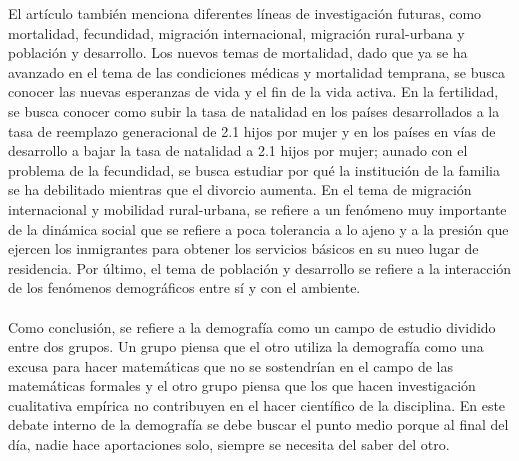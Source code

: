 \documentclass[11pt,spanish,letterpaper]{article}
\theoremstyle{plain}
\begin{document}
El art\'iculo tambi\'en menciona diferentes l\'ineas de investigaci\'on futuras, como mortalidad, fecundidad, migraci\'on internacional, migraci\'on rural-urbana y poblaci\'on y desarrollo. Los nuevos temas de mortalidad, dado que ya se ha avanzado en el tema de las condiciones m\'edicas y mortalidad temprana, se busca conocer las nuevas esperanzas de vida y el fin de la vida activa. En la fertilidad, se busca conocer como subir la tasa de natalidad en los pa\'ises desarrollados a la tasa de reemplazo generacional de 2.1 hijos por mujer y en los pa\'ises en v\'ias de desarrollo a bajar la tasa de natalidad a 2.1 hijos por mujer; aunado con el problema de la fecundidad, se busca estudiar por qu\'e la instituci\'on de la familia se ha debilitado mientras que el divorcio aumenta. En el tema de migraci\'on internacional y mobilidad rural-urbana, se refiere a un fen\'omeno muy importante de la din\'amica social que se refiere a poca tolerancia a lo ajeno y a la presi\'on que ejercen los inmigrantes para obtener los servicios b\'asicos en su nueo lugar de residencia. Por \'ultimo, el tema de poblaci\'on y desarrollo se refiere a la interacci\'on de los fen\'omenos demogr\'aficos entre s\'i y con el ambiente.\\
\\
Como conclusi\'on, se refiere a la demograf\'ia como un campo de estudio dividido entre dos grupos. Un grupo piensa que el otro utiliza la demograf\'ia como una excusa para hacer matem\'aticas que no se sostendr\'ian en el campo de las matem\'aticas formales y el otro grupo piensa que los que hacen investigaci\'on cualitativa emp\'irica no contribuyen en el hacer cient\'ifico de la disciplina. En este debate interno de la demograf\'ia se debe buscar el punto medio porque al final del d\'ia, nadie hace aportaciones solo, siempre se necesita del saber del otro.


\end{document}
